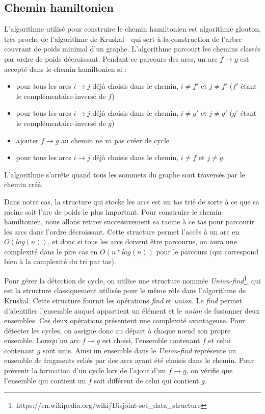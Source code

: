 \documentclass{article}
\begin{document}
\subsection{Chemin hamiltonien}

L'algorithme utilisé pour construire le chemin hamiltonien est algorithme glouton, très proche de l'algorithme de Kruskal - qui sert à la construction de l'arbre couvrant de poids minimal d'un graphe. L'algorithme parcourt les chemins classés par ordre de poids décroissant.
Pendant ce parcours des arcs, un arc $f \to g$ est accepté dans le chemin hamiltonien si :

\begin{itemize}
\item pour tous les arcs $i \to j$ déjà choisis dans le chemin, $i \neq f'$ et $j \neq f'$  ($f'$ étant le complémentaire-inversé de $f$)
\item pour tous les arcs $i \to j$ déjà choisis dans le chemin, $i \neq g'$ et $j \neq g'$  ($g'$ étant le complémentaire-inversé de $g$)
\item ajouter $f \to g$ au chemin ne va pas créer de cycle
\item pour tous les arcs $i \to j$ déjà choisis dans le chemin, $i \neq f$ et $j \neq g$.
\end{itemize}

L'algorithme s'arrête quand tous les sommets du graphe sont traversés par le chemin créé.

Dans notre cas, la structure qui stocke les arcs est un tas trié de sorte à ce que sa racine soit l'arc de poids le plus important. Pour construire le chemin hamiltonien, nous allons retirer successivement sa racine à ce tas pour parcourir les arcs dans l'ordre décroissant. Cette structure permet l'accès à un arc en $O(log(n))$, et donc si tous les arcs doivent être parcourus,  on aura une complexité dans le pire cas en $O(n*log(n))$ pour le parcours (qui correspond bien à la complexité du tri par tas).

Pour gérer la détection de cycle, on utilise une structure nommée \textit{Union-find}\footnote{https://en.wikipedia.org/wiki/Disjoint-set\_data\_structure}, qui est la structure classiquement utilisée pour le même rôle dans l'algorithme de Kruskal. Cette structure fournit les opérations \textit{find} et \textit{union}. Le \textit{find} permet d'identifier l'ensemble auquel appartient un élément et le \textit{union} de fusionner deux ensembles. Ces deux opérations présentent une complexité avantageuse. Pour détecter les cycles, on assigne donc au départ à chaque nœud son propre ensemble. Lorsqu'un arc $f \to g$ est choisi, l'ensemble contenant $f$ et celui contenant $g$ sont unis. Ainsi un ensemble dans le \textit{Union-find} représente un ensemble de fragments reliés par des arcs ayant été choisis dans le chemin. Pour prévenir la formation d'un cycle lors de l'ajout d'un $f \to g$, on vérifie que l'ensemble qui contient un $f$ soit différent de celui qui contient $g$.
\end{document}
